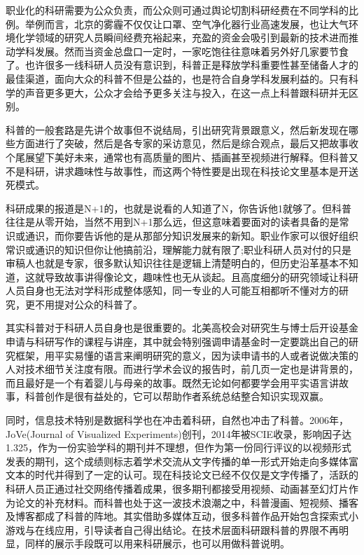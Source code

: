 \documentclass[]{book}
\begin{document}
职业化的科研需要为公众负责，而公众则可通过舆论切割科研经费在不同学科的比例。举例而言，北京的雾霾不仅仅让口罩、空气净化器行业高速发展，也让大气环境化学领域的研究人员瞬间经费充裕起来，充盈的资金会吸引到最新的技术进而推动学科发展。然而当资金总盘口一定时，一家吃饱往往意味着另外好几家要节食了。也许很多一线科研人员没有意识到，科普正是释放学科重要性甚至储备人才的最佳渠道，面向大众的科普不但是公益的，也是符合自身学科发展利益的。只有科学的声音更多更大，公众才会给予更多关注与投入，在这一点上科普跟科研并无区别。

科普的一般套路是先讲个故事但不说结局，引出研究背景跟意义，然后新发现在哪些方面进行了突破，然后是各专家的采访意见，然后是综合观点，最后又把故事收个尾展望下美好未来，通常也有高质量的图片、插画甚至视频进行解释。但科普又不是科研，讲求趣味性与故事性，而这两个特性要是出现在科技论文里基本是开送死模式。

科研成果的报道是N+1的，也就是说看的人知道了N，你告诉他1就够了。但科普往往是从零开始，当然不用到N+1那么远，但这意味着要面对的读者具备的是常识或通识，而你要告诉他的是从那部分知识发展来的新知。职业作家可以很好组织常识或通识的知识但你让他搞前沿，理解能力就有限了;职业科研人员对付的只是审稿人也就是专家，很多默认知识往往是逻辑上清楚明白的，但历史沿革基本不知道，这就导致故事讲得像论文，趣味性也无从谈起。且高度细分的研究领域让科研人员自身也无法对学科形成整体感知，同一专业的人可能互相都听不懂对方的研究，更不用提对公众的科普了。

其实科普对于科研人员自身也是很重要的。北美高校会对研究生与博士后开设基金申请与科研写作的课程与讲座，其中就会特别强调申请基金时一定要跳出自己的研究框架，用平实易懂的语言来阐明研究的意义，因为读申请书的人或者说做决策的人对技术细节关注度有限。而进行学术会议的报告时，前几页一定也是讲背景的，而且最好是一个有着婴儿与母亲的故事。既然无论如何都要学会用平实语言讲故事，科普创作是很有益处的，它可以帮助作者系统总结整合知识实现双赢。

同时，信息技术特别是数据科学也在冲击着科研，自然也冲击了科普。2006年，JoVe(Journal
of Visualized
Experiments)创刊，2014年被SCIE收录，影响因子达1.325，作为一份实验学科的期刊并不理想，但作为第一份同行评议的以视频形式发表的期刊，这个成绩则标志着学术交流从文字传播的单一形式开始走向多媒体富文本的时代并得到了一定的认可。现在科技论文已经不仅仅是文字传播了，活跃的科研人员正通过社交网络传播着成果，很多期刊都接受用视频、动画甚至幻灯片作为论文的补充材料。而科普也处于这一波技术浪潮之中，科普漫画、短视频、播客及博客都成了科普的阵地。其实借助多媒体互动，很多科普作品开始包含探索式小游戏与在线应用，引导读者自己得出结论。在技术层面科研跟科普的界限不再明显，同样的展示手段既可以用来科研展示，也可以用做科普说明。
\end{document}
